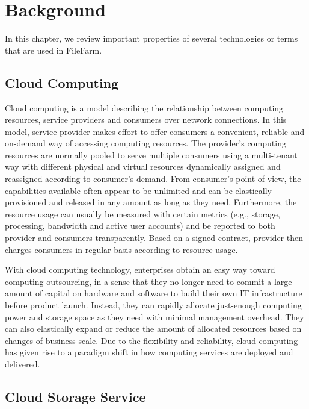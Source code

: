 \chapter{Background}
\label{c:background}

In this chapter, we review important properties of several technologies or terms that are used in FileFarm.

\section{Cloud Computing}
\label{s:cloudcomputing}

Cloud computing is a model describing the relationship between computing resources, service providers and consumers over network connections. In this model, service provider makes effort to offer consumers a convenient, reliable and on-demand way of accessing computing resources. The provider's computing resources are normally pooled to serve multiple consumers using a multi-tenant way with different physical and virtual resources dynamically assigned and reassigned according to consumer's demand. From consumer's point of view, the capabilities available often appear to be unlimited and can be elastically provisioned and released in any amount as long as they need. Furthermore, the resource usage can usually be measured with certain metrics (e.g., storage, processing, bandwidth and active user accounts) and be reported to both provider and consumers transparently. Based on a signed contract, provider then charges consumers in regular basis according to resource usage.\cite{mell2011nist}

\newpage

With cloud computing technology, enterprises obtain an easy way toward computing outsourcing, in a sense that they no longer need to commit a large amount of capital on hardware and software to build their own IT infrastructure before product launch. Instead, they can rapidly allocate just-enough computing power and storage space as they need with minimal management overhead. They can also elastically expand or reduce the amount of allocated resources based on changes of business scale. Due to the flexibility and reliability, cloud computing has given rise to a paradigm shift in how computing services are deployed and delivered.\cite{6123700}

\section{Cloud Storage Service}
\label{s:cloudstorageservice}

